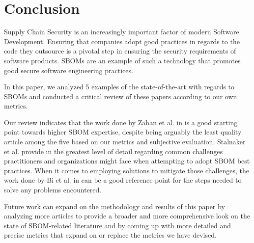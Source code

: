 \section{Conclusion}

Supply Chain Security is an increasingly important factor of modern Software Development. Ensuring that companies adopt good practices in regards to the code they outsource is a pivotal step in ensuring the security requirements of software products. SBOMs \cite{article:concept:sbom-2} are an example of such a technology that promotes good secure software engineering practices.

\noindent In this paper, we analyzed 5 examples of the state-of-the-art with regards to SBOMs and conducted a critical review of these papers according to our own metrics.

\noindent Our review indicates that the work done by Zahan et al. in \cite{article:sbom-required} is a good starting point towards higher SBOM expertise, despite being arguably the least quality article among the five based on our metrics and subjective evaluation. Stalnaker et al. provide in \cite{article:software-bom} the greatest level of detail regarding common challenges practitioners and organizations might face when attempting to adopt SBOM best practices. When it comes to employing solutions to mitigate those challenges, the work done by Bi et al. in \cite{article:sboms-issues-solutions} can be a good reference point for the steps needed to solve any problems encountered.

\noindent Future work can expand on the methodology and results of this paper by analyzing more articles to provide a broader and more comprehensive look on the state of SBOM-related literature and by coming up with more detailed and precise metrics that expand on or replace the metrics we have devised.